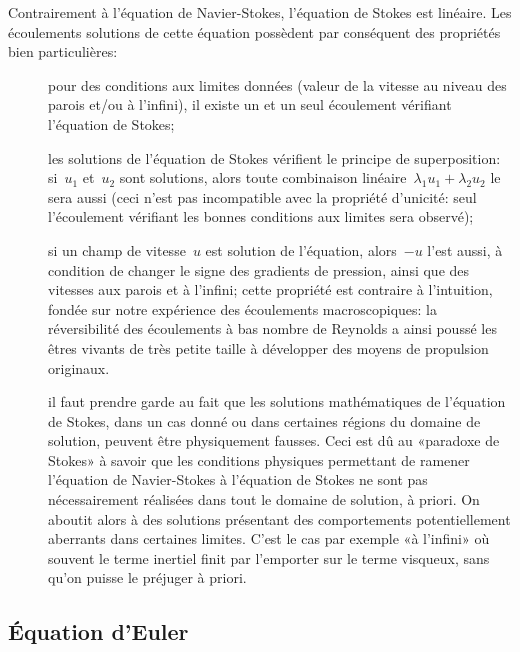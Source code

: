 \medskip
Contrairement à l'équation de Navier-Stokes, l'équation de Stokes est linéaire. Les écoulements solutions de cette équation possèdent par conséquent des propriétés bien particulières:
\begin{description}
  \item[]
	pour des conditions aux limites données (valeur de la vitesse au niveau des parois et/ou à l'infini), il existe un et un seul écoulement vérifiant l'équation de Stokes;
  \item[] 
	les solutions de l'équation de Stokes vérifient le principe de superposition: 
	si~$u_1$ et~$u_2$ sont solutions, alors toute combinaison linéaire~$\lambda_1 u_1 
	+ \lambda_2 u_2$ le sera aussi (ceci n'est pas incompatible avec la propriété d'unicité: seul 
	l'écoulement vérifiant les bonnes conditions aux limites sera observé);
  \item[] 
	si un champ de vitesse~$u$ est solution de l'équation, alors~$-u$ l'est aussi, à condition de changer le signe des gradients de pression, ainsi que des vitesses aux parois et à l'infini; cette propriété est contraire à l'intuition, fondée sur notre expérience des écoulements macroscopiques: la réversibilité des écoulements à bas nombre de Reynolds a ainsi poussé les êtres vivants de très petite taille à développer des moyens de propulsion originaux.
  \item[] 
	il faut prendre garde au fait que les solutions mathématiques de l'équation de Stokes, dans un cas donné ou dans certaines régions du domaine de solution, peuvent être physiquement fausses. Ceci est dû au «paradoxe de Stokes» à savoir que les conditions physiques permettant de ramener l'équation de Navier-Stokes à l'équation de Stokes ne sont pas nécessairement réalisées dans tout le domaine de solution, à priori. 
	On aboutit alors à des solutions présentant des comportements potentiellement aberrants dans certaines limites. C'est le cas par exemple «à l'infini» où souvent le terme inertiel finit par l'emporter sur le terme visqueux, sans qu'on puisse le préjuger à priori.
\end{description}




\medskip
\subsection{Équation d'Euler}



